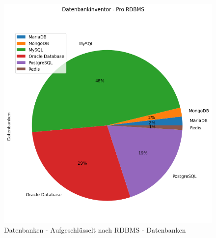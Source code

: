 \begin{flushleft}
    \begin{figure}[H]
        \centering
        \includegraphics[width=1\linewidth]{source/pandas_data_chart_plotter/db_inventory_per_rdbms_database}
        \caption{Datenbanken - Aufgeschlüsselt nach RDBMS - Datenbanken}
        \label{fig:db_inventory_per_rdbms_database}
    \end{figure}
    \begin{figure}[H]
        \centering

\end{figure}
\end{flushleft}
